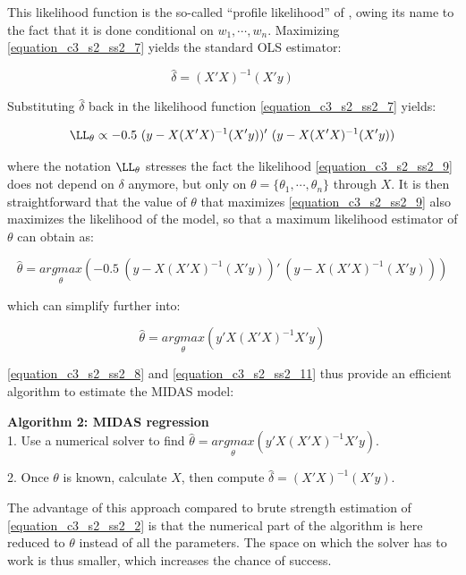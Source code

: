 This likelihood function is the so-called ``profile likelihood'' of \cite{Ghysels2016b}, owing its name to the fact that it is done conditional on $w_1, \cdots, w_n$. Maximizing \ref{equation_c3_s2_ss2_7} yields the standard OLS estimator:

\begin{equation}
\hat{\delta} = (X'X)^{-1} (X'y)
\label{equation_c3_s2_ss2_8}
\end{equation}

Substituting $\hat{\delta}$ back in the likelihood function \ref{equation_c3_s2_ss2_7} yields:

\begin{equation}
\LL_{\theta} \propto - 0.5 \ (y - X (X'X)^{-1} (X'y))' \ (y - X (X'X)^{-1} (X'y))
\label{equation_c3_s2_ss2_9}
\end{equation}

where the notation $\LL_{\theta}$ stresses the fact the likelihood \ref{equation_c3_s2_ss2_9} does not depend on $\delta$ anymore, but only on $\theta = \{ \theta_1, \cdots, \theta_n \}$ through $X$. It is then straightforward that the value of $\theta$ that maximizes \ref{equation_c3_s2_ss2_9} also maximizes the likelihood of the model, so that a maximum likelihood estimator of $\theta$ can obtain as:

\begin{equation}
\hat{\theta} =  \underset{\theta}{argmax} \left( - 0.5 \ (y - X (X'X)^{-1} (X'y))' \ (y - X (X'X)^{-1} (X'y)) \right)
\label{equation_c3_s2_ss2_10}
\end{equation}

which can simplify further into:

\begin{equation}
\hat{\theta} = \underset{\theta}{argmax} \left( y' X (X'X)^{-1} X' y \right)
\label{equation_c3_s2_ss2_11}
\end{equation}

\ref{equation_c3_s2_ss2_8} and \ref{equation_c3_s2_ss2_11} thus provide an efficient algorithm to estimate the MIDAS model:

\textbf{Algorithm 2: MIDAS regression} \vspace{3mm} \\
1. Use a numerical solver to find $\hat{\theta} = \underset{\theta}{argmax} \left( y' X (X'X)^{-1} X' y \right)$.

2. Once $\theta$ is known, calculate $X$, then compute $\hat{\delta} = (X'X)^{-1} (X'y)$.

The advantage of this approach compared to brute strength estimation of \ref{equation_c3_s2_ss2_2} is that the numerical part of the algorithm is here reduced to $\theta$ instead of all the parameters. The space on which the solver has to work is thus smaller, which increases the chance of success.


